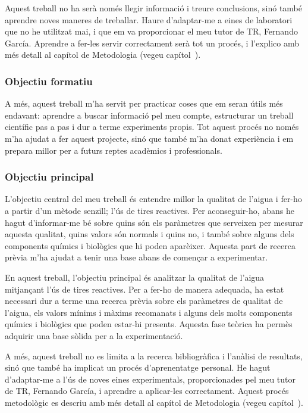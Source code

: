 Aquest treball no ha serà només llegir informació i treure conclusions, sinó també aprendre noves maneres de treballar. Haure d’adaptar-me a eines de laboratori que no he utilitzat mai, i que em va proporcionar el meu tutor de TR, Fernando García. Aprendre a fer-les servir correctament serà tot un procés, i l’explico amb més detall al capítol de Metodologia (vegeu capítol~).

\subsubsection{Objectiu formatiu}
A més, aquest treball m’ha servit per practicar coses que em seran útils més endavant: aprendre a buscar informació pel meu compte, estructurar un treball científic pas a pas i dur a terme experiments propis. Tot aquest procés no només m’ha ajudat a fer aquest projecte, sinó que també m’ha donat experiència i em prepara millor per a futurs reptes acadèmics i professionals.

\subsubsection{Objectiu principal}
L’objectiu central del meu treball és entendre millor la qualitat de l’aigua i fer-ho a partir d’un mètode senzill; l’ús de tires reactives. Per aconseguir-ho, abans he hagut d’informar-me bé sobre quins són els paràmetres que serveixen per mesurar aquesta qualitat, quins valors són normals i quins no, i també sobre alguns dels components químics i biològics que hi poden aparèixer. Aquesta part de recerca prèvia m’ha ajudat a tenir una base abans de començar a experimentar.





En aquest treball, l’objectiu principal és analitzar la qualitat de l’aigua mitjançant l’ús de tires reactives. Per a fer-ho de manera adequada, ha estat necessari dur a terme una recerca prèvia sobre els paràmetres de qualitat de l’aigua, els valors mínims i màxims recomanats i alguns dels molts components químics i biològics que poden estar-hi presents. Aquesta fase teòrica ha permès adquirir una base sòlida per a la experimentació.

A més, aquest treball no es limita a la recerca bibliogràfica i l’anàlisi de resultats, sinó que també ha implicat un procés d’aprenentatge personal. He hagut d’adaptar-me a l’ús de noves eines experimentals, proporcionades pel meu tutor de TR, Fernando García, i aprendre a aplicar-les correctament. Aquest procés metodològic es descriu amb més detall al capítol de Metodologia (vegeu capítol~).

